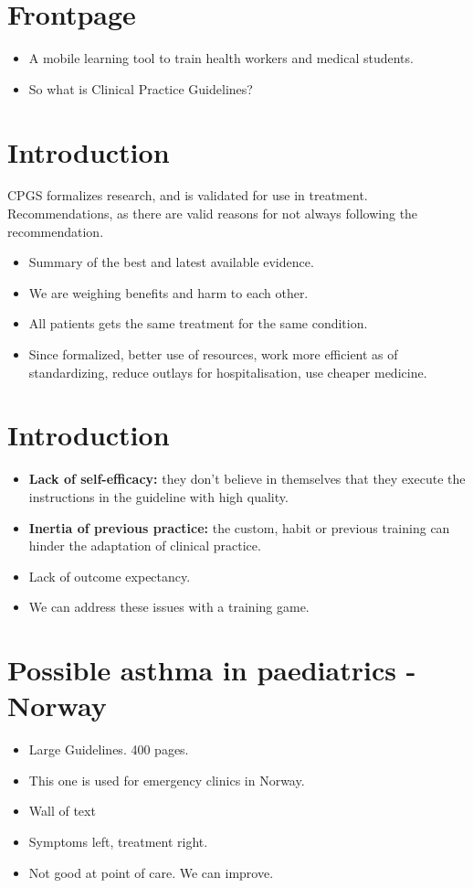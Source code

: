 \documentclass[20pt]{extarticle}
\begin{document}
	
	\section{Frontpage}
	\begin{itemize}
		\item A mobile learning tool to train health workers and medical students.
		\item So what is Clinical Practice Guidelines?
	\end{itemize}
	
	\section{Introduction}
	CPGS formalizes research, and is validated for use in treatment. 
	\newline
	Recommendations, as there are valid reasons for not always following the recommendation.
	\begin{itemize}
		\item Summary of the best and latest available evidence.
		\item We are weighing benefits and harm to each other.
		\item All patients gets the same treatment for the same condition.
		\item Since formalized, better use of resources, work more efficient as of standardizing, reduce outlays for hospitalisation, use cheaper medicine.
	\end{itemize}
	
	\section{Introduction}
	\begin{itemize}
		\item  \textbf{Lack of self-efficacy:} they don't believe in themselves that they execute the instructions in the guideline with high quality. 
		\item \textbf{Inertia of previous practice:} the custom, habit or previous training
		can hinder the adaptation of clinical practice.
		\item Lack of outcome expectancy.  
		\item We can address these issues with a training game.
	\end{itemize}
	
	\section{Possible asthma in paediatrics - Norway}
	\begin{itemize}
		\item Large Guidelines. 400 pages.
		\item This one is used for emergency clinics in Norway.
		\item Wall of text
		\item Symptoms left, treatment right.
		\item Not good at point of care. We can improve.
	\end{itemize}
	
\end{document}
